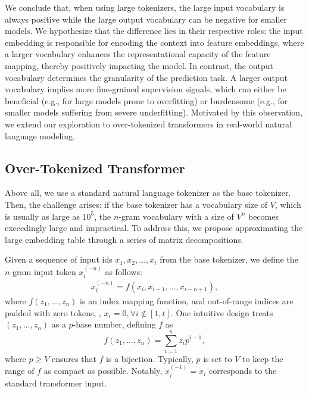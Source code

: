 We conclude that, when using large tokenizers, the large input vocabulary is always positive while the large output vocabulary can be negative for smaller models. We hypothesize that the difference lies in their respective roles: the input embedding is responsible for encoding the context into feature embeddings, where a larger vocabulary enhances the representational capacity of the feature mapping, thereby positively impacting the model. In contrast, the output vocabulary determines the granularity of the prediction task. A larger output vocabulary implies more fine-grained supervision signals, which can either be beneficial (e.g., for large models prone to overfitting) or burdensome (e.g., for smaller models suffering from severe underfitting).
Motivated by this observation, we extend our exploration to over-tokenized transformers in real-world natural language modeling.

\subsection{Over-Tokenized Transformer}

Above all, we use a standard natural language tokenizer as the base tokenizer. Then, the challenge arises: if the base tokenizer has a vocabulary size of $V$, which is usually as large as $10^5$, the $n$-gram vocabulary with a size of $V^n$ becomes exceedingly large and impractical. To address this, we propose approximating the large embedding table through a series of matrix decompositions.

Given a sequence of input ids $x_1,x_2,\dots,x_t$ from the base tokenizer, we define the $n$-gram input token $x^{(-n)}_i$  as follows:
\begin{align}
    x^{(-n)}_i = f(x_i,x_{i-1},\dots,x_{i-n+1}),
\end{align}
where $f(z_1, ..., z_n)$ is an index mapping function, and out-of-range indices are padded with zero tokens, \ie, $x_i = 0, \forall i \not\in [1, t]$. One intuitive design treats $(z_1, \dots, z_n)$ as a $p$-base number, defining  $f$ as 
\begin{equation}
    f(z_1, ..., z_n) = \sum_{i=1}^{n} z_i p^{i-1}, \label{eq:index_mapping_func}
\end{equation} 
where $p \geq V$ ensures that $f$ is a bijection. Typically, $p$ is set to $V$ to keep the range of $f$ as compact as possible. Notably, $x^{(-1)}_i = x_i$ corresponds to the standard transformer input.

